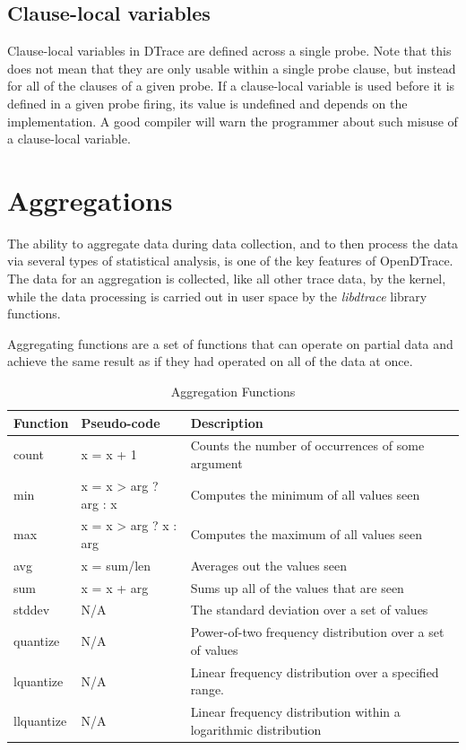\subsection{Clause-local variables}
\label{subsec:clause-local-variables}

Clause-local variables in DTrace are defined across a single probe. Note that
this does not mean that they are only usable within a single probe clause, but
instead for all of the clauses of a given probe. If a clause-local variable is
used before it is defined in a given probe firing, its value is undefined and
depends on the implementation. A good compiler will warn the programmer about
such misuse of a clause-local variable.

\section{Aggregations}
\label{sec:aggregations}

The ability to aggregate data during data collection, and to then
process the data via several types of statistical analysis, is one of
the key features of OpenDTrace.  The data for an aggregation is
collected, like all other trace data, by the kernel, while the data
processing is carried out in user space by the \emph{libdtrace}
library functions.

Aggregating functions are a set of functions that can operate on
partial data and achieve the same result as if they had operated
on all of the data at once.

\begin{table}
  \centering
  \begin{tabular}{l|l|l}
    Function & Pseudo-code & Description \\
    \hline
    count & x = x + 1 & Counts the number of occurrences of some argument \\
    min & x = x > arg ? arg : x & Computes the minimum of all values seen \\
    max & x = x > arg ? x : arg & Computes the maximum of all values seen \\
    avg & x = sum/len & Averages out the values seen \\
    sum & x = x + arg & Sums up all of the values that are seen \\
    stddev & N/A & The standard deviation over a set of values\\
    quantize & N/A & Power-of-two frequency distribution over a set of values\\
    lquantize & N/A & Linear frequency distribution over a specified range.\\
    llquantize & N/A & Linear frequency distribution within a logarithmic distribution
  \end{tabular}
  \caption{Aggregation Functions}
  \label{tab:agg-func}
\end{table}

